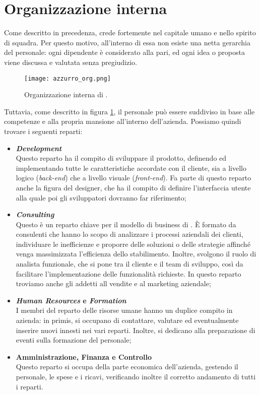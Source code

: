 \section{Organizzazione interna}
Come descritto in precedenza, \AD{} crede fortemente nel capitale umano e nello spirito di squadra. Per questo motivo, all'interno di essa non esiste una netta gerarchia del personale: ogni dipendente è considerato alla pari, ed ogni idea o proposta viene discussa e valutata senza pregiudizio. \\

\begin{figure}[h]
\texttt{[image: azzurro\_org.png]}
\centering
\caption{Organizzazione interna di \AD .}
\label{fig:azzurro-org}
\end{figure}

Tuttavia, come descritto in figura \ref{fig:azzurro-org}, il personale può essere suddiviso in base alle competenze e alla propria mansione all'interno dell'azienda. Possiamo quindi trovare i seguenti reparti:
\begin{itemize}
\item \textbf{\textit{Development}}\\
Questo reparto ha il compito di sviluppare il prodotto, definendo ed implementando tutte le caratteristiche accordate con il cliente, sia a livello logico (\textit{back-end}) che a livello visuale (\textit{front-end}). Fa parte di questo reparto anche la figura del designer, che ha il compito di definire l'interfaccia utente alla quale poi gli sviluppatori dovranno far riferimento;  
\item \textbf{\textit{Consulting}}\\
Questo è un reparto chiave per il modello di business di \AD{}. \`E formato da consulenti che hanno lo scopo di analizzare i processi aziendali dei clienti, individuare le inefficienze e proporre delle soluzioni o delle strategie affinché venga massimizzata l'efficienza dello stabilimento. Inoltre, svolgono il ruolo di analista funzionale, che si pone tra il cliente e il team di sviluppo, così da facilitare l'implementazione delle funzionalità richieste. In questo reparto troviamo anche gli addetti all vendite e al marketing aziendale;
\item \textbf{\textit{Human Resources} e \textit{Formation}}\\
I membri del reparto delle risorse umane hanno un duplice compito in azienda: in primis, si occupano di contattare, valutare ed eventualmente inserire nuovi innesti nei vari reparti. Inoltre, si dedicano alla preparazione di eventi sulla formazione del personale;
\item \textbf{Amministrazione, Finanza e Controllo}\\
Questo reparto si occupa della parte economica dell'azienda, gestendo il personale, le spese e i ricavi, verificando inoltre il corretto andamento di tutti i reparti.
\end{itemize}

